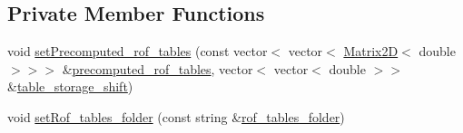 \subsection*{Private Member Functions}
\begin{DoxyCompactItemize}
\item 
void \mbox{\hyperlink{classSimulation_ac82ef64c2eccf84c9a623e066d135914_ac82ef64c2eccf84c9a623e066d135914}{set\+Precomputed\+\_\+rof\+\_\+tables}} (const vector$<$ vector$<$ \mbox{\hyperlink{classMatrix2D}{Matrix2D}}$<$ double $>$$>$$>$ \&\mbox{\hyperlink{classSimulation_a7fc97bea88fee3f551d22042ae813428_a7fc97bea88fee3f551d22042ae813428}{precomputed\+\_\+rof\+\_\+tables}}, vector$<$ vector$<$ double $>$$>$ \&\mbox{\hyperlink{classSimulation_a024cbe4c66a4329c5f12009434b8bdc2_a024cbe4c66a4329c5f12009434b8bdc2}{table\+\_\+storage\+\_\+shift}})
\item 
void \mbox{\hyperlink{classSimulation_a0f01e328435fab79c18ccdda28617bae_a0f01e328435fab79c18ccdda28617bae}{set\+Rof\+\_\+tables\+\_\+folder}} (const string \&\mbox{\hyperlink{classSimulation_aca810eb7785417158d897dfdf366e9fa_aca810eb7785417158d897dfdf366e9fa}{rof\+\_\+tables\+\_\+folder}})
\end{DoxyCompactItemize}
